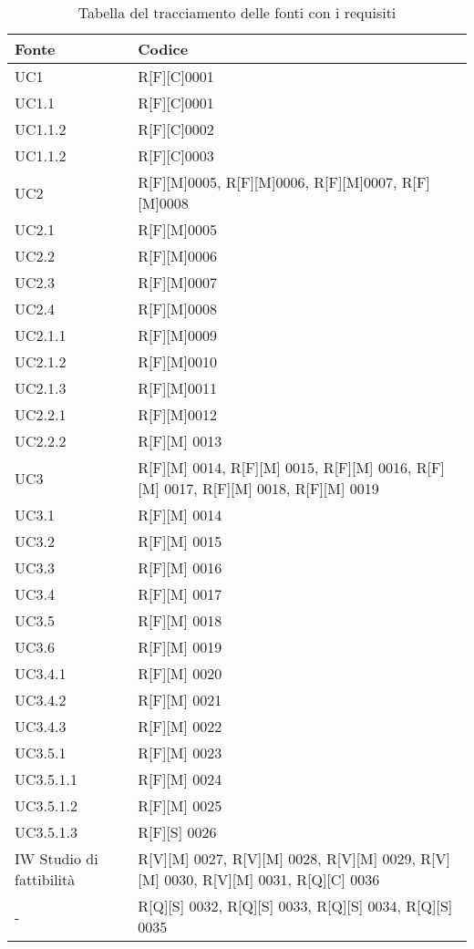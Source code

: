 \begin{table}%
    \caption{Tabella del tracciamento delle fonti con i requisiti}
    \label{tab:fonte-req}
    \begin{tabularx}{\textwidth}{lX}
    \hline\hline
    \textbf{Fonte}  & \textbf{Codice}\\
    \hline
    UC1    & R[F][C]0001  \\
    \hline
    UC1.1   & R[F][C]0001  \\
    \hline
    UC1.1.2    & R[F][C]0002  \\
    \hline
    UC1.1.2    & R[F][C]0003  \\
    \hline
    UC2   & R[F][M]0005, R[F][M]0006, R[F][M]0007, R[F][M]0008 \\
    \hline
    UC2.1    & R[F][M]0005  \\
    \hline
    UC2.2    & R[F][M]0006  \\
    \hline
    UC2.3    & R[F][M]0007  \\
    \hline
    UC2.4 & R[F][M]0008 \\
    \hline
    UC2.1.1 & R[F][M]0009 \\
    \hline
    UC2.1.2 & R[F][M]0010 \\
    \hline
    UC2.1.3 & R[F][M]0011 \\
    \hline
    UC2.2.1 & R[F][M]0012 \\
    \hline
    UC2.2.2 & R[F][M] 0013 \\
    \hline
    UC3 & R[F][M] 0014, R[F][M] 0015, R[F][M] 0016, R[F][M] 0017, R[F][M] 0018, R[F][M] 0019\\
    \hline
    UC3.1 & R[F][M] 0014 \\
    \hline
    UC3.2 & R[F][M] 0015 \\
    \hline
    UC3.3 & R[F][M] 0016 \\
    \hline
    UC3.4 & R[F][M] 0017 \\
    \hline
    UC3.5 & R[F][M] 0018 \\
    \hline
    UC3.6 & R[F][M] 0019 \\
    \hline
    UC3.4.1 & R[F][M] 0020 \\
    \hline
    UC3.4.2 & R[F][M] 0021 \\
    \hline
    UC3.4.3 & R[F][M] 0022 \\
    \hline
    UC3.5.1 & R[F][M] 0023 \\
    \hline
    UC3.5.1.1 & R[F][M] 0024 \\
    \hline
    UC3.5.1.2 & R[F][M] 0025 \\
    \hline
    UC3.5.1.3 & R[F][S] 0026 \\
    \hline
    IW Studio di fattibilità & R[V][M] 0027, R[V][M] 0028, R[V][M] 0029, R[V][M] 0030, R[V][M] 0031, R[Q][C] 0036 \\
    \hline
    - & R[Q][S] 0032, R[Q][S] 0033, R[Q][S] 0034, R[Q][S] 0035 \\
    \hline
    \end{tabularx}
    \end{table}%